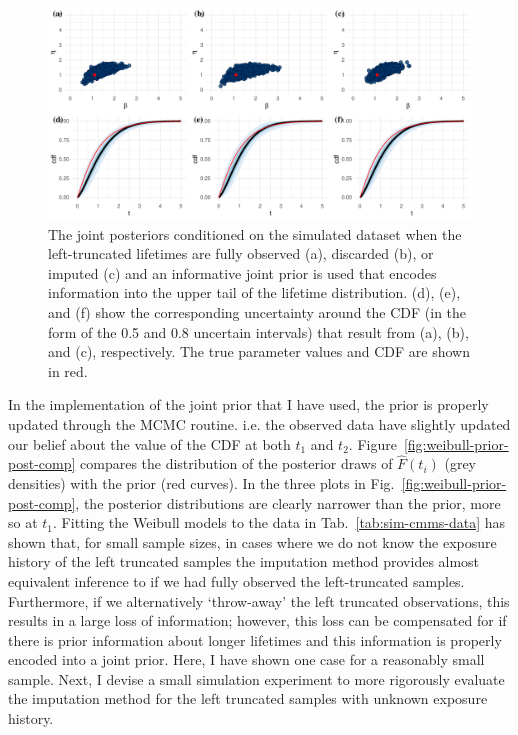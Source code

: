 \begin{figure}
    \centering
    \includegraphics[width=1\textwidth]{./figures/ch-2/joint-posts-inf.pdf}
    \caption{The joint posteriors conditioned on the simulated dataset when the left-truncated lifetimes are fully observed (a), discarded (b), or imputed (c) and an informative joint prior is used that encodes information into the upper tail of the lifetime distribution. (d), (e), and (f) show the corresponding uncertainty around the CDF (in the form of the 0.5 and 0.8 uncertain intervals) that result from (a), (b), and (c), respectively. The true parameter values and CDF are shown in red.}
    \label{fig:joint-post-weibull-inf}
\end{figure}

In the implementation of the joint prior that I have used, the prior is properly updated through the MCMC routine. i.e. the observed data have slightly updated our belief about the value of the CDF at both $t_1$ and $t_2$. Figure~\ref{fig:weibull-prior-post-comp} compares the distribution of the posterior draws of $\hat{F}(t_i)$ (grey densities) with the prior (red curves). In the three plots in Fig.~\ref{fig:weibull-prior-post-comp}, the posterior distributions are clearly narrower than the prior, more so at $t_1$. Fitting the Weibull models to the data in Tab.~\ref{tab:sim-cmms-data} has shown that, for small sample sizes, in cases where we do not know the exposure history of the left truncated samples the imputation method provides almost equivalent inference to if we had fully observed the left-truncated samples. Furthermore, if we alternatively `throw-away' the left truncated observations, this results in a large loss of information; however, this loss can be compensated for if there is prior information about longer lifetimes and this information is properly encoded into a joint prior. Here, I have shown one case for a reasonably small sample. Next, I devise a small simulation experiment to more rigorously evaluate the imputation method for the left truncated samples with unknown exposure history.


